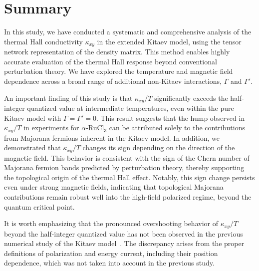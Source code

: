 \documentclass[twocolumn,superscriptaddress,showpacs, longbibliography, aps, prx]{revtex4-2}
\begin{document}
\section{Summary}
\label{sec:Summary}
In this study, we have conducted a systematic and comprehensive analysis of the thermal Hall conductivity $\kappa_{xy}$ in the extended Kitaev model, using the tensor network representation of the density matrix. 
This method enables highly accurate evaluation of the thermal Hall response beyond conventional perturbation theory. 
We have explored the temperature and magnetic field dependence across a broad range of additional non-Kitaev interactions, $\Gamma$ and $\Gamma'$. 

An important finding of this study is that $\kappa_{xy}/T$ significantly exceeds the half-integer quantized value at intermediate temperatures, even within the pure Kitaev model with $\Gamma=\Gamma'=0$. 
This result suggests that the hump observed in $\kappa_{xy}/T$ in experiments for $\alpha$-RuCl$_3$ can be attributed solely to the contributions from Majorana fermions inherent in the Kitaev model. 
In addition, we demonstrated that $\kappa_{xy}/T$ changes its sign depending on the direction of the magnetic field. 
This behavior is consistent with the sign of the Chern number of Majorana fermion bands predicted by perturbation theory, thereby supporting the topological origin of the thermal Hall effect. 
Notably, this sign change persists even under strong magnetic fields, indicating that topological Majorana contributions remain robust well into the high-field polarized regime, beyond the quantum critical point. 

It is worth emphasizing that the pronounced overshooting behavior of $\kappa_{xy}/T$ beyond the half-integer quantized value has not been observed in the previous numerical study of the Kitaev model~\cite{KumarT2023}. 
The discrepancy arises from the proper definitions of polarization and energy current, including their position dependence, which was not taken into account in the previous study. 
\end{document}
